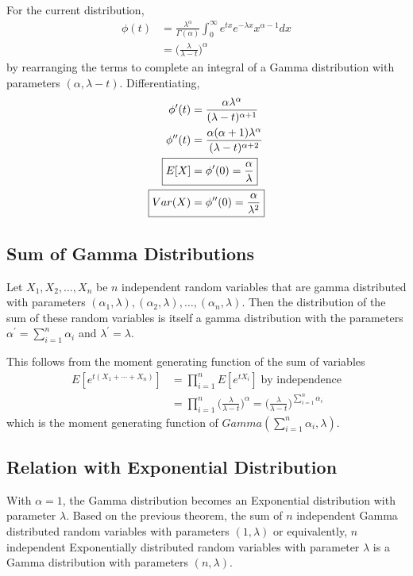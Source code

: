 \documentclass[../probability-notes.tex]{subfiles}
\begin{document}
    For the current distribution,
    \begin{align*}
        \phi(t) &= \frac{\lambda^{\alpha}}{\Gamma(\alpha)} \int_{0}^{\infty} e^{tx} e^{-\lambda x} x^{\alpha - 1} dx\\
        &= \bigg(\frac{\lambda}{\lambda - t}\bigg)^{\alpha}
    \end{align*}
    by rearranging the terms to complete an integral of a Gamma distribution with parameters $(\alpha, \lambda - t)$. Differentiating,
    \begin{align*}
        \phi^{\prime}(t) &= \frac{\alpha \lambda^{\alpha}}{(\lambda - t)^{\alpha + 1}}\\
        \phi^{\prime \prime}(t) &= \frac{\alpha(\alpha + 1)\lambda^{\alpha}}{(\lambda - t)^{\alpha + 2}}\\
        \Aboxed{E[X] &= \phi^{\prime}(0) = \frac{\alpha}{\lambda}}\\
        \Aboxed{Var(X) &= \phi^{\prime \prime}(0) = \frac{\alpha}{\lambda^{2}}}
    \end{align*}

    \subsection{Sum of Gamma Distributions}
    Let $X_{1}, X_{2}, \ldots, X_{n}$ be $n$ independent random variables that are gamma distributed with parameters \newline$(\alpha_{1}, \lambda), (\alpha_{2}, \lambda), \ldots, (\alpha_{n}, \lambda)$. Then the distribution of the sum of these random variables is itself a gamma distribution with the parameters $\alpha^{\prime} = \sum_{i=1}^{n} \alpha_{i}$ and $\lambda^{\prime} = \lambda$.\newline

    This follows from the moment generating function of the sum of variables
    \begin{align*}
        E[e^{t(X_{1} + \cdots + X_{n})}] &= \prod_{i=1}^{n} E[e^{tX_{i}}] \; \text{by independence}\\
        &= \prod_{i=1}^{n} \bigg(\frac{\lambda}{\lambda - t}\bigg)^{\alpha} = \bigg(\frac{\lambda}{\lambda - t}\bigg)^{\sum_{i=1}^{n} \alpha_{i}}
    \end{align*}
    which is the moment generating function of $Gamma(\sum_{i=1}^{n} \alpha_{i}, \lambda)$.

    \subsection{Relation with Exponential Distribution}
    With $\alpha = 1$, the Gamma distribution becomes an Exponential distribution with parameter $\lambda$. Based on the previous theorem, the sum of $n$ independent Gamma distributed random variables with parameters $(1, \lambda)$ or equivalently, $n$ independent Exponentially distributed random variables with parameter $\lambda$ is a Gamma distribution with parameters $(n, \lambda)$.
\end{document}
